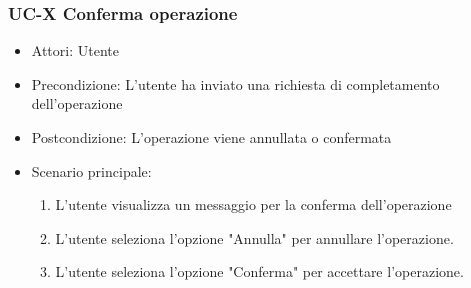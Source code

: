 \subsubsection{UC-X Conferma operazione}		
\begin{itemize}
	\item Attori: Utente
	\item Precondizione: L'utente ha inviato una richiesta di completamento dell'operazione
	\item Postcondizione: L'operazione viene annullata o confermata
	\item Scenario principale:
	\begin{enumerate}
		\item L'utente visualizza un messaggio per la conferma dell'operazione
		\item L'utente seleziona l'opzione "Annulla" per annullare l'operazione.
		\item L'utente seleziona l'opzione "Conferma" per accettare l'operazione.
	\end{enumerate}		
\end{itemize}
